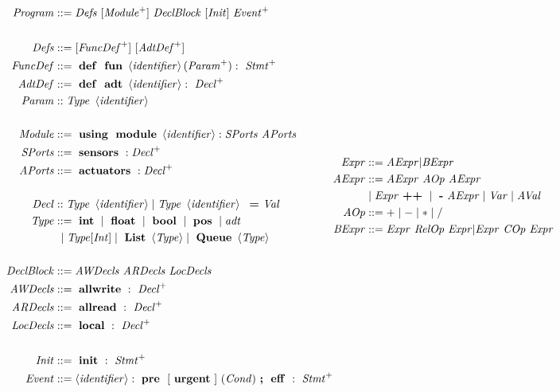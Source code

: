 \begin{figure}[H]
\begin{mdframed}
\scriptsize
\begin{align*}
\begin{split}
\pgm &::= \defs\ [\im]\ \db\ [\init]\ \evnts\  \\\\
\defs &::= [\fdefs^+]\ [\adefs^+]\\
\fdefs &::= \mterm{def}\mterm{fun} \id ( \params ):\ \stmts\\  
\adefs &::= \mterm{def}\mterm{adt} \id :\ \decls\\
\param &:: \type\ \id \\\\
\mathit{Module} &::= \mterm{using}\mterm{module}\id : \sports\ \aports\\
\sports &::= \mterm{sensors}:\decls \\ 
\aports &::= \mterm{actuators}:\decls\\\\
\decl &:: \type\ \id \mid \type\ \id \ \mterm{=} \val \\
\type &::= \mterm{int}\mid \mterm{float}\mid\mterm{bool}\mid \mterm{pos}\mid \mathit{adt} \\ &\ \mid \type [\mathit{Int}]\mid \mterm{List}\left\langle\type\right\rangle \mid \mterm{Queue}\left\langle\type\right\rangle\\\\
\db &::= \awd\ \ard\ \ld\\
\awd &::= \mterm{allwrite}:\ \decls\\ 
\ard &::= \mterm{allread}:\ \decls\\ 
\ld &::= \mterm{local}:\ \decls\\\\
\init &::= \mterm{init}:\ \stmts\\
\evnt &::= \id: \mterm{pre}\ [\mterm{urgent}]\ (\cnd)\mterm{;}\mterm{eff}:\ \stmts\\
\end{split}\begin{split}
\expr &::= \aexpr | \bexpr \\
\aexpr &::= \aexpr\ \mathit{AOp}\ \aexpr\\  
&\mid \expr \mterm{++} \mid \mterm{-} \aexpr \mid \var \mid \aval \\
\mathit{AOp} &::= +\mid-\mid*\mid / \\ 
\bexpr &::=  \expr\ \mathit{RelOp}\ \expr | \expr\ \mathit{COp}\ \expr\\

\end{split}
\end{align*}
\end{mdframed}
\end{figure}
